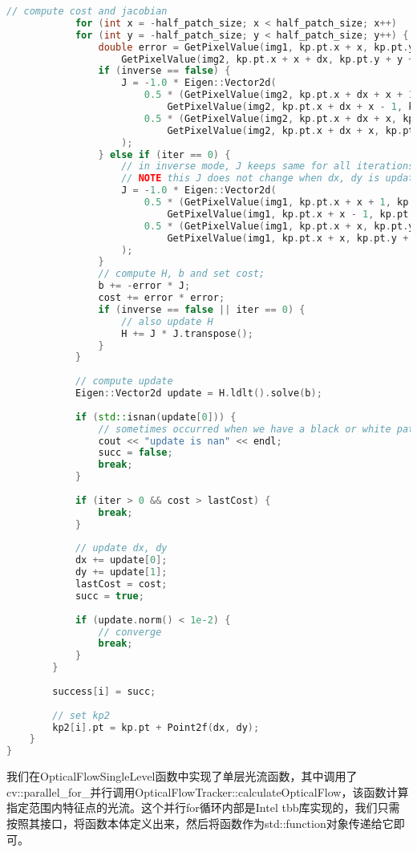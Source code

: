 \begin{lstlisting}[language=c++,caption=slambook2/ch8/optical_flow.cpp（片段）]
			// compute cost and jacobian
			for (int x = -half_patch_size; x < half_patch_size; x++)
			for (int y = -half_patch_size; y < half_patch_size; y++) {
				double error = GetPixelValue(img1, kp.pt.x + x, kp.pt.y + y) -
					GetPixelValue(img2, kp.pt.x + x + dx, kp.pt.y + y + dy);;  // Jacobian
				if (inverse == false) {
					J = -1.0 * Eigen::Vector2d(
						0.5 * (GetPixelValue(img2, kp.pt.x + dx + x + 1, kp.pt.y + dy + y) -
							GetPixelValue(img2, kp.pt.x + dx + x - 1, kp.pt.y + dy + y)),
						0.5 * (GetPixelValue(img2, kp.pt.x + dx + x, kp.pt.y + dy + y + 1) -
							GetPixelValue(img2, kp.pt.x + dx + x, kp.pt.y + dy + y - 1))
					);
				} else if (iter == 0) {
					// in inverse mode, J keeps same for all iterations
					// NOTE this J does not change when dx, dy is updated, so we can store it and only compute error
					J = -1.0 * Eigen::Vector2d(
						0.5 * (GetPixelValue(img1, kp.pt.x + x + 1, kp.pt.y + y) -
							GetPixelValue(img1, kp.pt.x + x - 1, kp.pt.y + y)),
						0.5 * (GetPixelValue(img1, kp.pt.x + x, kp.pt.y + y + 1) -
							GetPixelValue(img1, kp.pt.x + x, kp.pt.y + y - 1))
					);
				}
				// compute H, b and set cost;
				b += -error * J;
				cost += error * error;
				if (inverse == false || iter == 0) {
					// also update H
					H += J * J.transpose();
				}
			}
			
			// compute update
			Eigen::Vector2d update = H.ldlt().solve(b);
			
			if (std::isnan(update[0])) {
				// sometimes occurred when we have a black or white patch and H is irreversible
				cout << "update is nan" << endl;
				succ = false;
				break;
			}
			
			if (iter > 0 && cost > lastCost) {
				break;
			}
			
			// update dx, dy
			dx += update[0];
			dy += update[1];
			lastCost = cost;
			succ = true;
			
			if (update.norm() < 1e-2) {
				// converge
				break;
			}
		}
		
		success[i] = succ;
		
		// set kp2
		kp2[i].pt = kp.pt + Point2f(dx, dy);
	}
}
\end{lstlisting}

我们在OpticalFlowSingleLevel函数中实现了单层光流函数，其中调用了cv::parallel\_for\_并行调用OpticalFlowTracker::calculateOpticalFlow，该函数计算指定范围内特征点的光流。这个并行for循环内部是Intel tbb库实现的，我们只需按照其接口，将函数本体定义出来，然后将函数作为std::function对象传递给它即可。

